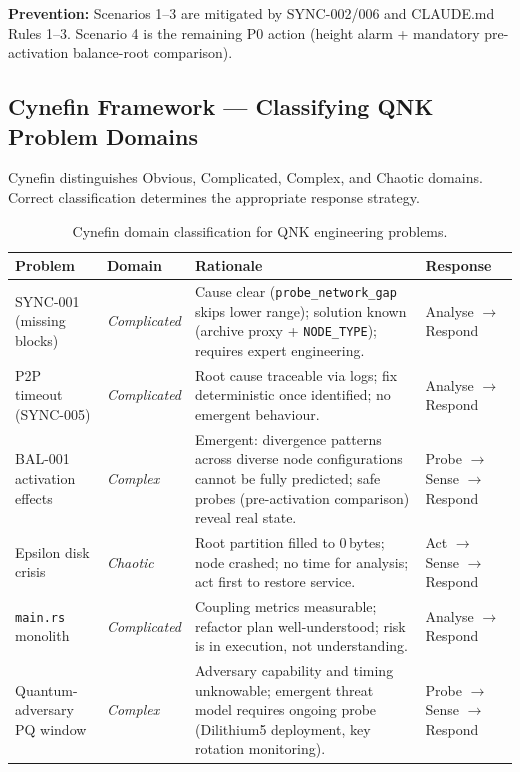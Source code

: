 \documentclass[12pt,a4paper]{article}
\begin{document}
\textbf{Prevention:} Scenarios 1--3 are mitigated by SYNC-002/006 and
CLAUDE.md Rules 1--3. Scenario 4 is the remaining P0 action (height alarm +
mandatory pre-activation balance-root comparison).

\subsection{Cynefin Framework --- Classifying QNK Problem Domains}

Cynefin distinguishes Obvious, Complicated, Complex, and Chaotic domains.
Correct classification determines the appropriate response strategy.

\begin{table}[H]
\centering
\small
\renewcommand{\arraystretch}{1.3}
\begin{tabularx}{\linewidth}{llXl}
\toprule
\textbf{Problem} & \textbf{Domain} & \textbf{Rationale} & \textbf{Response} \\
\midrule
SYNC-001 (missing blocks) &
  \textit{Complicated} &
  Cause clear (\texttt{probe\_network\_gap} skips lower range); solution known
  (archive proxy + \texttt{NODE\_TYPE}); requires expert engineering. &
  Analyse $\to$ Respond \\
\rowcolor{rowgray}
P2P timeout (SYNC-005) &
  \textit{Complicated} &
  Root cause traceable via logs; fix deterministic once identified;
  no emergent behaviour. &
  Analyse $\to$ Respond \\
BAL-001 activation effects &
  \textit{Complex} &
  Emergent: divergence patterns across diverse node configurations
  cannot be fully predicted; safe probes (pre-activation comparison)
  reveal real state. &
  Probe $\to$ Sense $\to$ Respond \\
\rowcolor{rowgray}
Epsilon disk crisis &
  \textit{Chaotic} &
  Root partition filled to 0\,bytes; node crashed; no time for analysis;
  act first to restore service. &
  Act $\to$ Sense $\to$ Respond \\
\texttt{main.rs} monolith &
  \textit{Complicated} &
  Coupling metrics measurable; refactor plan well-understood;
  risk is in execution, not understanding. &
  Analyse $\to$ Respond \\
\rowcolor{rowgray}
Quantum-adversary PQ window &
  \textit{Complex} &
  Adversary capability and timing unknowable; emergent threat model requires
  ongoing probe (Dilithium5 deployment, key rotation monitoring). &
  Probe $\to$ Sense $\to$ Respond \\
\bottomrule
\end{tabularx}
\caption{Cynefin domain classification for QNK engineering problems.}
\end{table}
\end{document}
